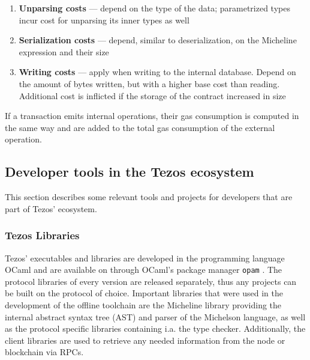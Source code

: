 \begin{enumerate}
\item \textbf{Unparsing costs} --- depend on the type of the data; parametrized types incur cost for unparsing its inner types as well
\item \textbf{Serialization costs} --- depend, similar to deserialization, on the Micheline expression and their size
\item \textbf{Writing costs} --- apply when writing to the internal database. Depend on the amount of bytes written, but with a higher base cost than reading. Additional cost is inflicted if the storage of the contract increased in size
\end{enumerate}
If a transaction emits internal operations, their gas consumption is computed in the same way and are added to the total gas consumption of the external operation.

\subsection{Developer tools in the Tezos ecosystem}
This section describes some relevant tools and projects for developers that are part of Tezos' ecosystem.

\subsubsection{Tezos Libraries}
Tezos' executables and libraries are developed in the programming language OCaml and are available on through OCaml's package manager \texttt{opam} \cite{tezos_opam}. The protocol libraries of every version are released separately, thus any projects can be built on the protocol of choice. Important libraries that were used in the development of the offline toolchain are the Micheline library providing the internal abstract syntax tree (AST) and parser of the Michelson language, as well as the protocol specific libraries containing i.a. the type checker. Additionally, the client libraries are used to retrieve any needed information from the node or blockchain via RPCs.

